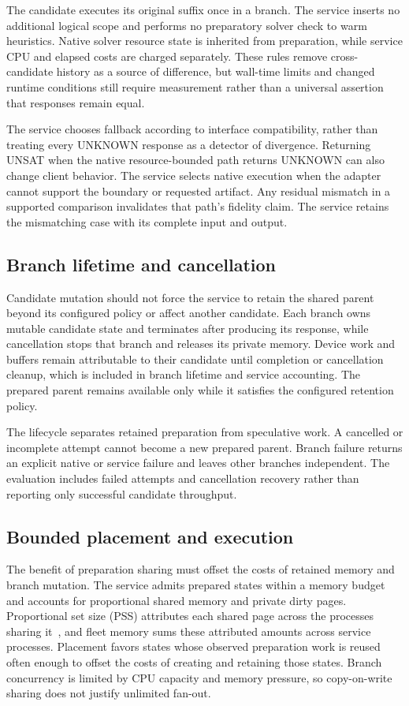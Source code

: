 \documentclass[10pt,twocolumn]{article}
\begin{document}
The candidate executes its original suffix once in a branch. The service inserts no additional logical scope and performs no preparatory solver check to warm heuristics. Native solver resource state is inherited from preparation, while service CPU and elapsed costs are charged separately. These rules remove cross-candidate history as a source of difference, but wall-time limits and changed runtime conditions still require measurement rather than a universal assertion that responses remain equal.

The service chooses fallback according to interface compatibility, rather than treating every UNKNOWN response as a detector of divergence. Returning UNSAT when the native resource-bounded path returns UNKNOWN can also change client behavior. The service selects native execution when the adapter cannot support the boundary or requested artifact. Any residual mismatch in a supported comparison invalidates that path's fidelity claim. The service retains the mismatching case with its complete input and output.

\subsection{Branch lifetime and cancellation}
Candidate mutation should not force the service to retain the shared parent beyond its configured policy or affect another candidate. Each branch owns mutable candidate state and terminates after producing its response, while cancellation stops that branch and releases its private memory. Device work and buffers remain attributable to their candidate until completion or cancellation cleanup, which is included in branch lifetime and service accounting. The prepared parent remains available only while it satisfies the configured retention policy.

The lifecycle separates retained preparation from speculative work. A cancelled or incomplete attempt cannot become a new prepared parent. Branch failure returns an explicit native or service failure and leaves other branches independent. The evaluation includes failed attempts and cancellation recovery rather than reporting only successful candidate throughput.

\subsection{Bounded placement and execution}\label{sec:placement}
The benefit of preparation sharing must offset the costs of retained memory and branch mutation. The service admits prepared states within a memory budget and accounts for proportional shared memory and private dirty pages. Proportional set size (PSS) attributes each shared page across the processes sharing it~\cite{procMemory}, and fleet memory sums these attributed amounts across service processes. Placement favors states whose observed preparation work is reused often enough to offset the costs of creating and retaining those states. Branch concurrency is limited by CPU capacity and memory pressure, so copy-on-write sharing does not justify unlimited fan-out.
\end{document}
